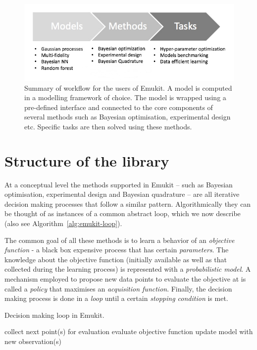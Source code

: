 \begin{figure}[h]
    \centering
    \includegraphics[scale=0.4]{workflow.png}  
    \caption{Summary of workflow for the users of Emukit. A model is computed in a modelling framework of choice. The model is wrapped using a pre-defined interface and connected to the core components of several methods such as Bayesian optimisation, experimental design etc. Specific tasks are then solved using these methods.}
    \label{figure:workflow}
\end{figure}

\section{Structure of the library}\label{sec:lib-structure}

At a conceptual level the methods supported in Emukit -- such as Bayesian optimisation, experimental design and Bayesian quadrature -- are all iterative decision making processes that follow a similar pattern. Algorithmically they can be thought of as instances of a common abstract loop, which we now describe (also see Algorithm~\ref{alg:emukit-loop}).

The common goal of all these methods is to learn a behavior of an \textit{objective function} - a black box expensive process that has certain \textit{parameters}. The knowledge about the objective function (initially available as well as that collected during the learning process) is represented with a \textit{probabilistic model}. A mechanism employed to propose new data points to evaluate the objective at is called a \emph{policy} that maximises an \textit{acquisition function}. Finally, the decision making process is done in a \textit{loop} until a certain \textit{stopping condition} is met. 

\begin{algorithm}[H]
  \caption{Decision making loop in Emukit.}
  \label{alg:emukit-loop}
  \begin{algorithmic}[1]
      \State collect next point(s) for evaluation
      \State evaluate objective function
      \State update model with new observation(s)
    \EndWhile
  \end{algorithmic}
\end{algorithm}

